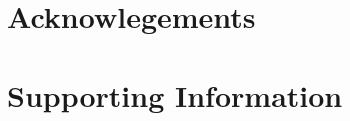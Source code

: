 \section{Acknowlegements}





\onecolumngrid

\pagebreak
\FloatBarrier

\beginsupplement
\setcounter{secnumdepth}{4}
\section{Supporting Information}


\pagebreak


\pagebreak




